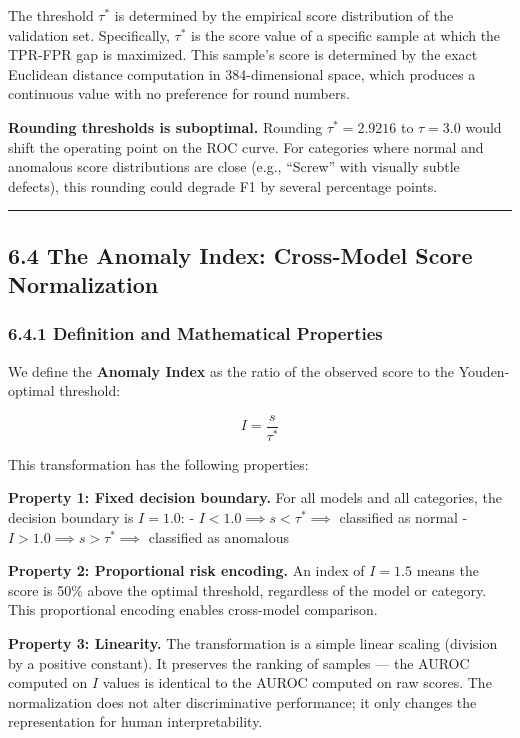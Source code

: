 The threshold \(\tau^*\) is determined by the empirical score distribution of the validation set. Specifically, \(\tau^*\) is the score value of a specific sample at which the TPR-FPR gap is maximized. This sample's score is determined by the exact Euclidean distance computation in 384-dimensional space, which produces a continuous value with no preference for round numbers.

\textbf{Rounding thresholds is suboptimal.} Rounding \(\tau^* = 2.9216\) to \(\tau = 3.0\) would shift the operating point on the ROC curve. For categories where normal and anomalous score distributions are close (e.g., ``Screw'' with visually subtle defects), this rounding could degrade F1 by several percentage points.

\begin{center}\rule{0.5\linewidth}{0.5pt}\end{center}

\subsection{6.4 The Anomaly Index: Cross-Model Score Normalization}\label{the-anomaly-index-cross-model-score-normalization}

\subsubsection{6.4.1 Definition and Mathematical Properties}\label{definition-and-mathematical-properties}

We define the \textbf{Anomaly Index} as the ratio of the observed score to the Youden-optimal threshold:

\[I = \frac{s}{\tau^*}\]

This transformation has the following properties:

\textbf{Property 1: Fixed decision boundary.} For all models and all categories, the decision boundary is \(I = 1.0\): - \(I < 1.0 \implies s < \tau^* \implies\) classified as normal - \(I > 1.0 \implies s > \tau^* \implies\) classified as anomalous

\textbf{Property 2: Proportional risk encoding.} An index of \(I = 1.5\) means the score is 50\% above the optimal threshold, regardless of the model or category. This proportional encoding enables cross-model comparison.

\textbf{Property 3: Linearity.} The transformation is a simple linear scaling (division by a positive constant). It preserves the ranking of samples --- the AUROC computed on \(I\) values is identical to the AUROC computed on raw scores. The normalization does not alter discriminative performance; it only changes the representation for human interpretability.

